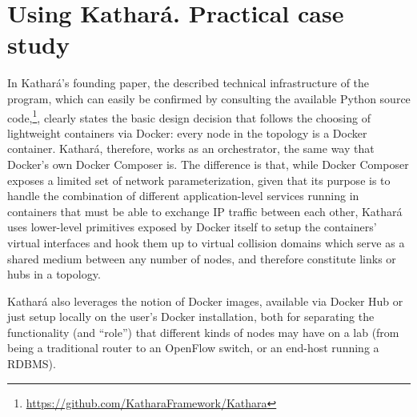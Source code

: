 \section{Using Kathará. Practical case study}
\label{sec:katharapracticalcasestudy}

In Kathará's founding paper, the described technical infrastructure of the program, which can easily be confirmed by consulting the available Python source code,\footnote{\url{https://github.com/KatharaFramework/Kathara}}, clearly states the basic design decision that follows the choosing of lightweight containers via Docker: every node in the topology is a Docker container.
Kathará, therefore, works as an orchestrator, the same way that Docker's own Docker Composer is.
The difference is that, while Docker Composer exposes a limited set of network parameterization, given that its purpose is to handle the combination of different application-level services running in containers that must be able to exchange IP traffic between each other, Kathará uses lower-level primitives exposed by Docker itself to setup the containers' virtual interfaces and hook them up to virtual collision domains which serve as a shared medium between any number of nodes, and therefore constitute links or hubs in a topology.

Kathará also leverages the notion of Docker images, available via Docker Hub or just setup locally on the user's Docker installation, both for separating the functionality (and ``role'') that different kinds of nodes may have on a lab (from being a traditional router to an OpenFlow switch, or an end-host running a RDBMS). %


